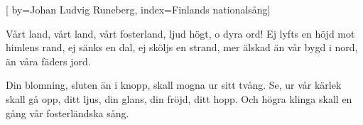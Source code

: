 %

[
  by={Johan Ludvig Runeberg},
  index={Finlands nationalsång}]  
  
\beginverse*
Vårt land, vårt land, vårt fosterland,
ljud högt, o dyra ord!
Ej lyfts en höjd mot himlens rand,
ej sänks en dal, ej sköljs en strand,
mer älskad än vår bygd i nord,
än våra fäders jord.
\endverse

\beginverse*
Din blomning, sluten än i knopp,
skall mogna ur sitt tvång.
Se, ur vår kärlek skall gå opp,
ditt ljus, din glans, din fröjd, ditt hopp.
Och högra klinga skall en gång
vår fosterländska sång.
\endverse
\endsong
